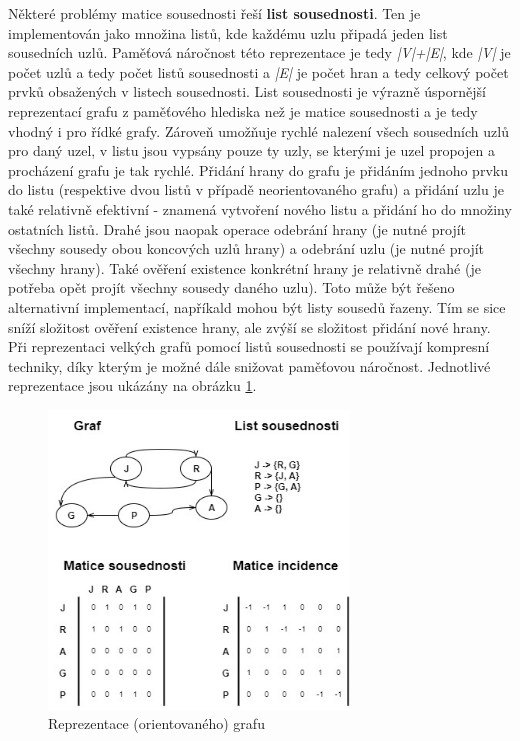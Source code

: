 Některé problémy matice sousednosti řeší \textbf{list sousednosti}. Ten je implementován jako množina listů, kde každému uzlu připadá jeden list sousedních uzlů. Paměťová náročnost této reprezentace je tedy \textit{|V|+|E|}, kde \textit{|V|} je počet uzlů a tedy počet listů sousednosti a \textit{|E|} je počet hran a tedy celkový počet prvků obsažených v listech sousednosti. List sousednosti je výrazně úspornější reprezentací grafu z paměťového hlediska než je matice sousednosti a je tedy vhodný i pro řídké grafy. Zároveň umožňuje rychlé nalezení všech sousedních uzlů pro daný uzel, v listu jsou vypsány pouze ty uzly, se kterými je uzel propojen a procházení grafu je tak rychlé. Přidání hrany do grafu je přidáním jednoho prvku do listu (respektive dvou listů v případě neorientovaného grafu) a přidání uzlu je také relativně efektivní - znamená vytvoření nového listu a přidání ho do množiny ostatních listů. Drahé jsou naopak operace odebrání hrany (je nutné projít všechny sousedy obou koncových uzlů hrany) a odebrání uzlu (je nutné projít všechny hrany). Také ověření existence konkrétní hrany je relativně drahé (je potřeba opět projít všechny sousedy daného uzlu). Toto může být řešeno alternativní implementací, napříkald mohou být listy sousedů řazeny. Tím se sice sníží složitost ověření existence hrany, ale zvýší se složitost přidání nové hrany.
Při reprezentaci velkých grafů pomocí listů sousednosti se používají kompresní techniky, díky kterým je možné dále snižovat paměťovou náročnost.\cite{Boldi04} Jednotlivé reprezentace jsou ukázány na obrázku \ref{fig:reprezentace}.


\begin{figure}
\begin{center}
\includegraphics[width=8cm]{figures/graph_reprezentation}
\caption{Reprezentace (orientovaného) grafu}
\label{fig:reprezentace}
\end{center}
\end{figure}

